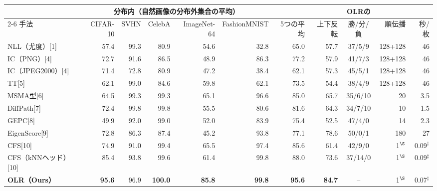 \documentclass[border=3pt]{standalone}
\newcommand{\B}[1]{\textcolor{tnavy}{\textbf{#1}}}
\newcommand{\dg}{\rlap{$^{\dagger}$}}
\begin{document}
%
\begin{tabular}{l*{5}{r}rrcrr}%
\toprule
 & \multicolumn{5}{c}{分布内（自然画像の分布外集合の平均）} & & & OLRの & & \\
\cmidrule(lr){2-6}
手法 & CIFAR-10 & SVHN & CelebA & ImageNet-64 & FashionMNIST & 5つの平均 & 上下反転 & 勝/分/負 & 順伝播 & 秒/枚\\
\midrule
NLL（尤度）[1] & 57.4 & 99.3 & 80.9 & 54.6 & 32.8 & 65.0 & 57.7 & 37/5/9 & 128+128 & 46\\
IC（PNG）[4] & 72.7 & 91.6 & 86.5 & 48.9 & 86.3 & 77.2 & 57.9 & 41/7/3 & 128+128 & 46\\
IC（JPEG2000）[4] & 71.4 & 72.8 & 80.9 & 47.2 & 38.4 & 62.1 & 57.3 & 45/5/1 & 128+128 & 46\\
TT[5] & 62.1 & 99.0 & 84.6 & 59.8 & 62.1 & 73.5 & 54.4 & 38/4/9 & 128+128 & 46\\
MSMA型[6] & 64.5 & 99.3 & 99.3 & 65.1 & 96.6 & 85.0 & 65.7 & 35/6/10 & 20 & 3.5\\
DiffPath[7] & 72.4 & 99.8\dg & 99.8\dg & 55.5 & 80.6 & 81.6 & 64.3 & 34/7/10 & 10 & 1.5\\
GEPC[8] & 49.9 & 92.0 & 99.0 & 52.0 & 83.9 & 75.4 & 52.5 & 47/4/0 & 14 & 2.3\\
EigenScore[9] & 72.8 & 86.3 & 87.4 & 45.2 & 93.8 & 77.1 & 78.6\dg & 50/0/1 & 180 & 27\\
\midrule
CFS[10] & 74.9 & 91.0 & 99.4 & 65.5\dg & 97.4 & 85.6 & 61.4 & 42/9/0 & 1$^{\S}$\dg & 0.09$^{\ddagger}$\dg\\
CFS（kNNヘッド）[10] & 85.4\dg & 93.8 & 99.6 & 61.4 & 99.8\dg & 88.0\dg & 73.6 & 37/14/0 & 1$^{\S}$\dg & 0.09$^{\ddagger}$\dg\\
\midrule
\textbf{OLR（Ours）} & \B{95.6} & 96.9 & \B{100.0} & \B{85.8} & \B{99.8} & \B{95.6} & \B{84.7} & – & 1$^{\S}$ & 0.07$^{\ddagger}$\\
\bottomrule
\end{tabular}%
\end{document}
